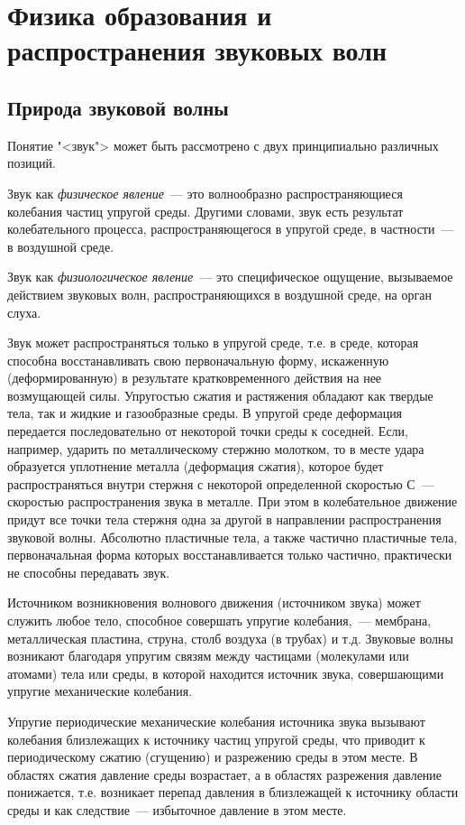 \documentclass[oneside, final, 14pt]{extreport}
\begin{document}
\chapter{Физика образования и распространения звуковых волн}
\section{Природа звуковой волны}
Понятие "<звук"> может быть рассмотрено с двух принципиально различных позиций.

Звук как {\itshape физическое явление}~--- это волнообразно распространяющиеся колебания частиц упругой среды. Другими словами, звук есть результат колебательного процесса, распространяющегося в упругой среде, в частности~--- в воздушной среде.

Звук как {\itshape физиологическое явление}~--- это специфическое ощущение, вызываемое действием звуковых волн, распространяющихся в воздушной среде, на орган слуха.

Звук может распространяться только в упругой среде, т.е. в среде, которая способна восстанавливать свою первоначальную форму, искаженную (деформированную) в результате кратковременного действия на нее возмущающей силы. Упругостью сжатия и растяжения обладают как твердые тела, так и жидкие и газообразные среды. В упругой среде деформация передается последовательно от некоторой точки среды к соседней. Если, например, ударить по металлическому стержню молотком, то в месте удара образуется уплотнение металла (деформация сжатия), которое будет распространяться внутри стержня с некоторой определенной скоростью \(С\)~--- скоростью распространения звука в металле. При этом в колебательное движение придут все точки тела стержня одна за другой в направлении распространения звуковой волны. Абсолютно пластичные тела, а также частично пластичные тела, первоначальная форма которых восстанавливается только частично, практически не способны передавать звук.

Источником возникновения волнового движения (источником звука) может служить любое тело, способное совершать упругие колебания,~--- мембрана, металлическая пластина, струна, столб воздуха (в трубах) и т.д. Звуковые волны возникают благодаря упругим связям между частицами (молекулами или атомами) тела или среды, в которой находится источник звука, совершающими упругие механические колебания.

Упругие периодические механические колебания источника звука вызывают колебания близлежащих к источнику частиц упругой среды, что приводит к периодическому сжатию (сгущению) и разрежению среды в этом месте. В областях сжатия давление среды возрастает, а в областях разрежения давление понижается, т.е. возникает перепад давления в близлежащей к источнику области среды и как следствие~--- избыточное давление в этом месте.
\end{document}
